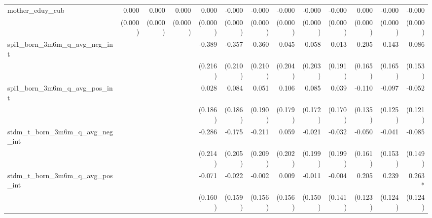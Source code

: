 \begin{tabular}{lrrrrrrrrrrrr}
mother\_eduy\_cub                           &        0.000 &        0.000 &        0.000 &        0.000 &       -0.000 &       -0.000 &       -0.000 &       -0.000 &       -0.000 &        0.000 &       -0.000 &       -0.000 \\ 
                                            &      (0.000) &      (0.000) &      (0.000) &      (0.000) &      (0.000) &      (0.000) &      (0.000) &      (0.000) &      (0.000) &      (0.000) &      (0.000) &      (0.000) \\ 
spi1\_born\_3m6m\_q\_avg\_neg\_int          &              &              &              &       -0.389 &       -0.357 &       -0.360 &        0.045 &        0.058 &        0.013 &        0.205 &        0.143 &        0.086 \\ 
                                            &              &              &              &      (0.216) &      (0.210) &      (0.210) &      (0.204) &      (0.203) &      (0.191) &      (0.165) &      (0.165) &      (0.153) \\ 
spi1\_born\_3m6m\_q\_avg\_pos\_int          &              &              &              &        0.028 &        0.084 &        0.051 &        0.106 &        0.085 &        0.039 &       -0.110 &       -0.097 &       -0.052 \\ 
                                            &              &              &              &      (0.186) &      (0.186) &      (0.190) &      (0.179) &      (0.172) &      (0.170) &      (0.135) &      (0.125) &      (0.121) \\ 
stdm\_t\_born\_3m6m\_q\_avg\_neg\_int       &              &              &              &       -0.286 &       -0.175 &       -0.211 &        0.059 &       -0.021 &       -0.032 &       -0.050 &       -0.041 &       -0.085 \\ 
                                            &              &              &              &      (0.214) &      (0.205) &      (0.209) &      (0.202) &      (0.199) &      (0.199) &      (0.161) &      (0.153) &      (0.149) \\ 
stdm\_t\_born\_3m6m\_q\_avg\_pos\_int       &              &              &              &       -0.071 &       -0.022 &       -0.002 &        0.009 &       -0.011 &       -0.004 &        0.205 &        0.239 &       0.263* \\ 
                                            &              &              &              &      (0.160) &      (0.159) &      (0.156) &      (0.156) &      (0.150) &      (0.141) &      (0.123) &      (0.124) &      (0.124) \\ 

\end{tabular}
